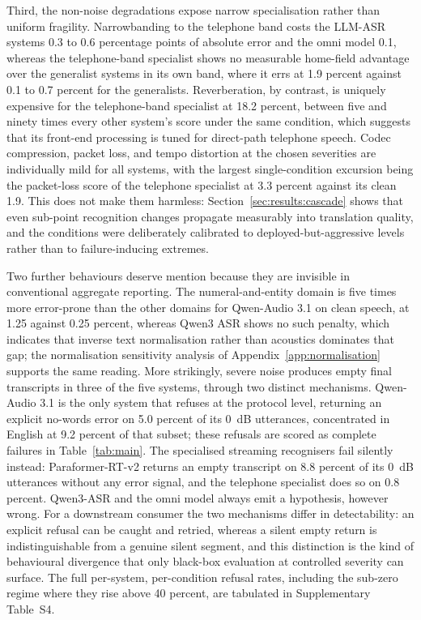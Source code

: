 Third, the non-noise degradations expose narrow specialisation rather than
uniform fragility. Narrowbanding to the telephone band costs the LLM-ASR
systems 0.3 to 0.6 percentage points of absolute error and the omni model
0.1, whereas the telephone-band specialist shows no measurable home-field
advantage over the generalist systems in its own band, where it errs at 1.9
percent against 0.1 to 0.7 percent for the generalists. Reverberation, by
contrast, is uniquely expensive for the telephone-band specialist at 18.2
percent, between five and ninety times every other system's score under
the same condition, which suggests that its front-end processing is tuned
for direct-path telephone speech. Codec compression, packet loss, and
tempo distortion at the chosen severities are individually mild for all
systems, with the largest single-condition excursion being the packet-loss
score of the telephone specialist at 3.3 percent against its clean 1.9.
This does not make them harmless: Section~\ref{sec:results:cascade}
shows that even sub-point recognition changes propagate measurably into
translation quality, and the conditions were deliberately calibrated to
deployed-but-aggressive levels rather than to failure-inducing extremes.

Two further behaviours deserve mention because they are invisible in
conventional aggregate reporting. The numeral-and-entity domain is five times
more error-prone than the other domains for Qwen-Audio 3.1 on clean speech,
at 1.25 against 0.25 percent, whereas Qwen3 ASR shows no such penalty, which
indicates that inverse text normalisation rather than acoustics dominates
that gap; the normalisation sensitivity analysis of
Appendix~\ref{app:normalisation} supports the same reading. More strikingly,
severe noise produces empty final transcripts in three of the five systems,
through two distinct mechanisms. Qwen-Audio 3.1 is the only system that
refuses at the protocol level, returning an explicit no-words error on 5.0
percent of its 0~dB utterances, concentrated in English at 9.2 percent of
that subset; these refusals are scored as complete failures in
Table~\ref{tab:main}. The specialised streaming recognisers fail silently
instead: Paraformer-RT-v2 returns an empty transcript on 8.8 percent of its
0~dB utterances without any error signal, and the telephone specialist does
so on 0.8 percent. Qwen3-ASR and the omni model always emit a hypothesis,
however wrong. For a downstream consumer the two mechanisms differ in
detectability: an explicit refusal can be caught and retried, whereas a
silent empty return is indistinguishable from a genuine silent segment, and
this distinction is the kind of behavioural divergence that only black-box
evaluation at controlled severity can surface. The full per-system,
per-condition refusal rates, including the sub-zero regime where they rise
above 40 percent, are tabulated in Supplementary Table~S4.

